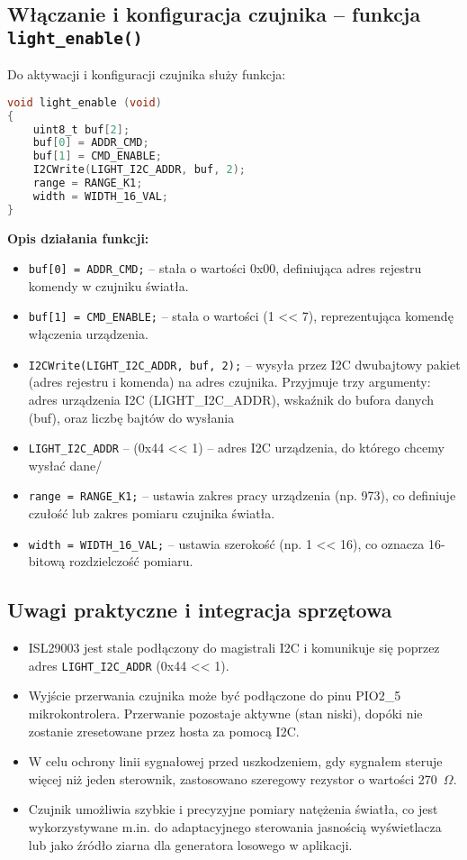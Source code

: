 \documentclass[a4paper,12pt]{report}
\begin{document}
\subsection*{Włączanie i konfiguracja czujnika – funkcja \texttt{light\_enable()}}

Do aktywacji i konfiguracji czujnika służy funkcja:

\begin{lstlisting}[language=C]
void light_enable (void)
{
    uint8_t buf[2];
    buf[0] = ADDR_CMD;
    buf[1] = CMD_ENABLE;
    I2CWrite(LIGHT_I2C_ADDR, buf, 2);
    range = RANGE_K1;
    width = WIDTH_16_VAL;
}
\end{lstlisting}

\textbf{Opis działania funkcji:}
\begin{itemize}
    \item \texttt{buf[0] = ADDR\_CMD;} – stała o wartości 0x00, definiująca adres rejestru komendy w czujniku światła.
    \item \texttt{buf[1] = CMD\_ENABLE;} – stała o wartości (1 << 7), reprezentująca komendę włączenia urządzenia.
    \item \texttt{I2CWrite(LIGHT\_I2C\_ADDR, buf, 2);} – wysyła przez I2C dwubajtowy pakiet (adres rejestru i komenda) na adres czujnika. Przyjmuje trzy argumenty: adres urządzenia I2C (LIGHT\_I2C\_ADDR), wskaźnik do bufora danych (buf), oraz liczbę bajtów do wysłania
    \item \texttt{LIGHT\_I2C\_ADDR} – (0x44 << 1) – adres I2C urządzenia, do którego chcemy wysłać dane/
    \item \texttt{range = RANGE\_K1;} – ustawia zakres pracy urządzenia (np. 973), co definiuje czułość lub zakres pomiaru czujnika światła.
    \item \texttt{width = WIDTH\_16\_VAL;} – ustawia szerokość (np. 1 << 16), co oznacza 16-bitową rozdzielczość pomiaru.
\end{itemize}

\subsection*{Uwagi praktyczne i integracja sprzętowa}

\begin{itemize}
    \item ISL29003 jest stale podłączony do magistrali I2C i komunikuje się poprzez adres \texttt{LIGHT\_I2C\_ADDR} (0x44 << 1).
    \item Wyjście przerwania czujnika może być podłączone do pinu PIO2\_5 mikrokontrolera. Przerwanie pozostaje aktywne (stan niski), dopóki nie zostanie zresetowane przez hosta za pomocą I2C.
    \item W celu ochrony linii sygnałowej przed uszkodzeniem, gdy sygnałem steruje więcej niż jeden sterownik, zastosowano szeregowy rezystor o wartości 270~$\Omega$.
    \item Czujnik umożliwia szybkie i precyzyjne pomiary natężenia światła, co jest wykorzystywane m.in. do adaptacyjnego sterowania jasnością wyświetlacza lub jako źródło ziarna dla generatora losowego w aplikacji.
\end{itemize}
\end{document}
